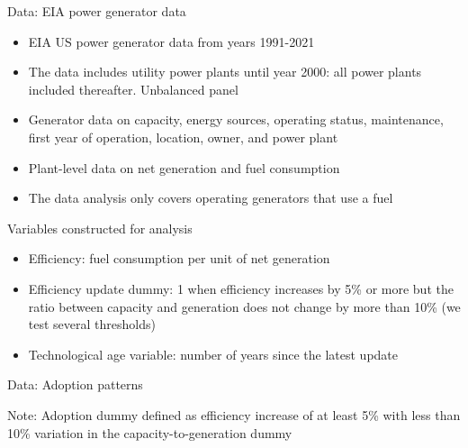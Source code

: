 \documentclass{beamer}
\begin{document}
\begin{frame}{Data: EIA power generator data}\label{Data}

\begin{itemize}
 \item EIA US power generator data from years 1991-2021
 \item The data includes utility power plants until year 2000: all power plants included thereafter. Unbalanced panel
 \item Generator data on capacity, energy sources, operating status, maintenance, first year of operation, location, owner, and power plant
 \item Plant-level data on net generation and fuel consumption
  \item The data analysis only covers operating generators that use a fuel


\end{itemize}

\hyperlink{effic_between_model}{}
\end{frame}
\begin{frame}{Variables constructed for analysis}

 \begin{itemize}
     \item Efficiency: fuel consumption per unit of net generation
     \item Efficiency update dummy: 1 when efficiency increases by 5\% or more but the ratio between capacity and generation does not change by more than 10\% (we test several thresholds)
     \item Technological age variable: number of years since the latest update
 \end{itemize}

    
\end{frame}



\begin{frame}{Data: Adoption patterns}\label{patterns_1gen}
\footnotesize
\begin{table}
\centering
\caption{Technology adoption dummy regressed on covariates, single-generator plants}

\end{table}
\footnotesize{Note: Adoption dummy defined as efficiency increase of at least 5\% with less than 10\% variation in the capacity-to-generation dummy }

\hyperlink{patterns_all}{}
\hyperlink{obscount}{}
\end{frame}
\end{document}
